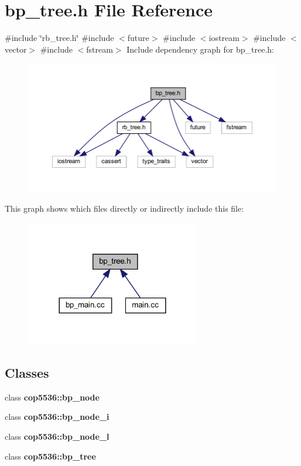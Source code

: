 \section{bp\+\_\+tree.\+h File Reference}
\label{bp__tree_8h}
{\ttfamily \#include \char`\"{}rb\+\_\+tree.\+h\char`\"{}}\newline
{\ttfamily \#include $<$future$>$}\newline
{\ttfamily \#include $<$iostream$>$}\newline
{\ttfamily \#include $<$vector$>$}\newline
{\ttfamily \#include $<$fstream$>$}\newline
Include dependency graph for bp\+\_\+tree.\+h\+:
\nopagebreak
\begin{figure}[H]
\begin{center}
\leavevmode
\includegraphics[width=350pt]{bp__tree_8h__incl}
\end{center}
\end{figure}
This graph shows which files directly or indirectly include this file\+:
\nopagebreak
\begin{figure}[H]
\begin{center}
\leavevmode
\includegraphics[width=216pt]{bp__tree_8h__dep__incl}
\end{center}
\end{figure}
\subsection*{Classes}
\begin{DoxyCompactItemize}
\item 
class \textbf{ cop5536\+::bp\+\_\+node}
\item 
class \textbf{ cop5536\+::bp\+\_\+node\+\_\+i}
\item 
class \textbf{ cop5536\+::bp\+\_\+node\+\_\+l}
\item 
class \textbf{ cop5536\+::bp\+\_\+tree}
\end{DoxyCompactItemize}
